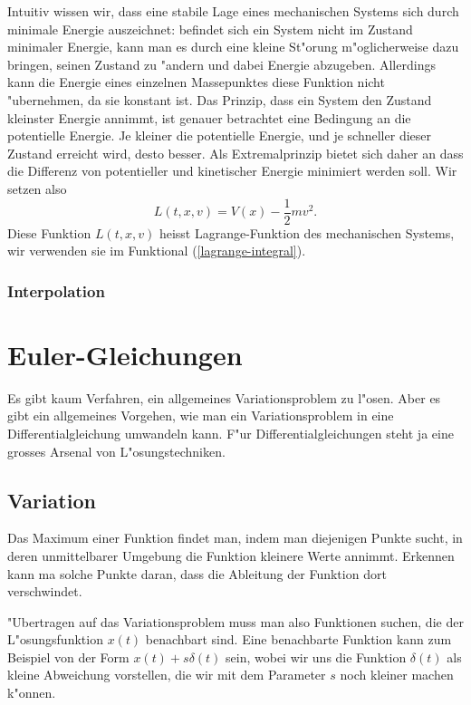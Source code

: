 Intuitiv wissen wir, dass eine stabile Lage eines mechanischen Systems
sich durch minimale Energie auszeichnet: befindet sich ein System nicht
im Zustand minimaler Energie, kann man es durch eine kleine 
St"orung m"oglicherweise dazu bringen, seinen Zustand zu "andern
und dabei Energie abzugeben. Allerdings kann die Energie eines
einzelnen Massepunktes diese Funktion nicht "ubernehmen, da sie
konstant ist. Das Prinzip, dass ein System den Zustand kleinster
Energie annimmt, ist genauer betrachtet eine Bedingung an die potentielle
Energie. Je kleiner die potentielle Energie, und je schneller dieser
Zustand erreicht wird, desto besser. Als Extremalprinzip bietet
sich daher an dass die Differenz von potentieller und kinetischer
Energie minimiert werden soll. Wir setzen also
\begin{equation}
L(t,x,v)=V(x)-\frac12mv^2.
\label{lagrange-funktion}
\end{equation}
Diese Funktion $L(t,x,v)$ heisst Lagrange-Funktion des mechanischen
Systems, wir
verwenden sie im Funktional (\ref{lagrange-integral}).

\subsubsection{Interpolation}

\section{Euler-Gleichungen}
Es gibt kaum Verfahren, ein allgemeines Variationsproblem zu l"osen.
Aber es gibt ein allgemeines Vorgehen, wie man ein Variationsproblem
in eine Differentialgleichung umwandeln kann. F"ur Differentialgleichungen
steht ja eine grosses Arsenal von L"osungstechniken.
\subsection{Variation}
Das Maximum einer Funktion findet man, indem man diejenigen
Punkte sucht, in deren unmittelbarer Umgebung die Funktion kleinere
Werte annimmt. Erkennen kann ma solche Punkte daran, dass die Ableitung
der Funktion dort verschwindet.

"Ubertragen auf das Variationsproblem muss man also Funktionen 
suchen, die der L"osungsfunktion $x(t)$ benachbart sind.
Eine benachbarte Funktion kann zum Beispiel von der Form
$x(t)+s\delta(t)$ sein, wobei wir uns die Funktion $\delta(t)$
als kleine Abweichung vorstellen, die wir mit dem Parameter
$s$ noch kleiner machen k"onnen. 

